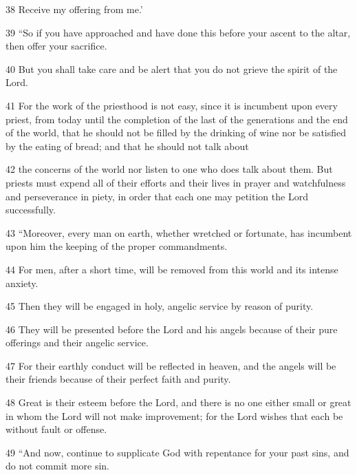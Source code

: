 \par 38 Receive my offering from me.’

\par 39 “So if you have approached and have done this before your ascent to the altar, then offer your sacrifice. 

\par 40 But you shall take care and be alert that you do not grieve the spirit of the Lord. 

\par 41 For the work of the priesthood is not easy, since it is incumbent upon every priest, from today until the completion of the last of the generations and the end of the world, that he should not be filled by the drinking of wine nor be satisfied by the eating of bread; and that he should not talk about 

\par 42 the concerns of the world nor listen to one who does talk about them. But priests must expend all of their efforts and their lives in prayer and watchfulness and perseverance in piety, in order that each one may petition the Lord successfully. 

\par 43 “Moreover, every man on earth, whether wretched or fortunate, has incumbent upon him the keeping of the proper commandments. 

\par 44 For men, after a short time, will be removed from this world and its intense anxiety. 

\par 45 Then they will be engaged in holy, angelic service by reason of purity. 

\par 46 They will be presented before the Lord and his angels because of their pure offerings and their angelic service. 

\par 47 For their earthly conduct will be reflected in heaven, and the angels will be their friends because of their perfect faith and purity. 

\par 48 Great is their esteem before the Lord, and there is no one either small or great in whom the Lord will not make improvement; for the Lord wishes that each be without fault or offense. 

\par 49 “And now, continue to supplicate God with repentance for your past sins, and do not commit more sin. 


